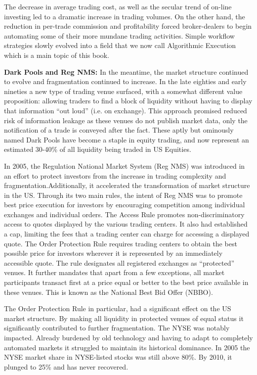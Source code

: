 The decrease in average trading cost, as well as the secular trend of on-line investing led to a dramatic increase in trading volumes. On the other hand, the reduction in per-trade commission and profitability forced broker-dealers to begin automating some of their more mundane trading activities. Simple workflow strategies slowly evolved into a field that we now call Algorithmic Execution which is a main topic of this book. \twomedskip


\noindent\textbf{Dark Pools and Reg NMS:} \label{in:regnms} In the meantime, the market structure continued to evolve and fragmentation continued to increase. In the late eighties and early nineties a new type of trading venue surfaced, with a somewhat different value proposition: allowing traders to find a block of liquidity without having to display that information ``out loud'' (i.e. on exchange). This approach promised reduced risk of information leakage as these venues do not publish market data, only the notification of a trade is conveyed after the fact.  These aptly but ominously named Dark Pools have become a staple in equity trading, and now represent an estimated 30-40\% of all liquidity being traded in US Equities. \twomedskip

In 2005, the Regulation National Market System (Reg NMS) was introduced in an effort to protect investors from the increase in trading complexity and fragmentation.Additionally, it accelerated the transformation of market structure in the US. Through its two main rules, the intent of Reg NMS was to promote best price execution for investors by encouraging competition among individual exchanges and individual orders. The Access Rule promotes non-discriminatory access to quotes displayed by the various trading centers. It also had established a cap, limiting the fees that a trading center can charge for accessing a displayed quote. The Order Protection Rule requires trading centers to obtain the best possible price for investors wherever it is represented by an immediately accessible quote. The rule designates all registered exchanges as ``protected'' venues. It further mandates that apart from a few exceptions, all market participants transact first at a price equal or better to the best price available in these venues. This is known as the National Best Bid Offer (NBBO). 

The Order Protection Rule in particular, had a significant effect on the US market structure. By making all liquidity in protected venues of equal status it significantly contributed to further fragmentation. The NYSE was notably impacted. Already burdened by old technology and having to adapt to completely automated markets it struggled to maintain its historical dominance. In 2005 the NYSE market share in NYSE-listed stocks was  still above 80\%. By 2010, it plunged to 25\% and has never recovered.

